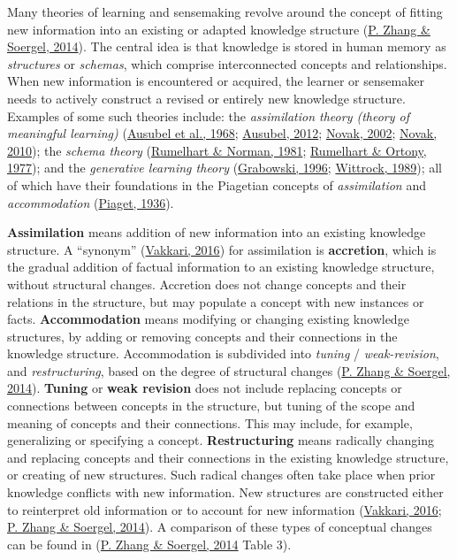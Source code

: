 \documentclass[a4paper, nobind]{templates/ociamthesis}
\begin{document}
Many theories of learning and sensemaking revolve around the concept of
fitting new information into an existing or adapted knowledge structure
(\protect\hyperlink{ref-zhang2014towards}{P. Zhang \& Soergel, 2014}). The central idea is that knowledge is stored in
human memory as \emph{structures} or \emph{schemas}, which comprise interconnected
concepts and relationships. When new information is encountered or
acquired, the learner or sensemaker needs to actively construct a
revised or entirely new knowledge structure. Examples of some such
theories include: the \emph{assimilation theory (theory of meaningful
learning)}
(\protect\hyperlink{ref-ausubel1968educational}{Ausubel et al., 1968}; \protect\hyperlink{ref-ausubel2012acquisition}{Ausubel, 2012}; \protect\hyperlink{ref-novak2002meaningful}{Novak, 2002}; \protect\hyperlink{ref-novak2010learninga}{Novak, 2010});
the \emph{schema theory}
(\protect\hyperlink{ref-rumelhart1981accretion}{Rumelhart \& Norman, 1981}; \protect\hyperlink{ref-rumelhart1977representation}{Rumelhart \& Ortony, 1977}); and the
\emph{generative learning theory}
(\protect\hyperlink{ref-grabowski1996generative}{Grabowski, 1996}; \protect\hyperlink{ref-wittrock1989generative}{Wittrock, 1989}); all of which have
their foundations in the Piagetian concepts of \emph{assimilation} and
\emph{accommodation} (\protect\hyperlink{ref-piaget1936origins}{Piaget, 1936}).

\textbf{Assimilation} means addition of new information into an existing
knowledge structure. A ``synonym'' (\protect\hyperlink{ref-vakkari2016searching}{Vakkari, 2016}) for
assimilation is \textbf{accretion}, which is the gradual addition of factual
information to an existing knowledge structure, without structural
changes. Accretion does not change concepts and their relations in the
structure, but may populate a concept with new instances or facts.
\textbf{Accommodation} means modifying or changing existing knowledge
structures, by adding or removing concepts and their connections in the
knowledge structure. Accommodation is subdivided into \emph{tuning} /
\emph{weak-revision}, and \emph{restructuring}, based on the degree of structural
changes (\protect\hyperlink{ref-zhang2014towards}{P. Zhang \& Soergel, 2014}). \textbf{Tuning} or \textbf{weak revision} does not
include replacing concepts or connections between concepts in the
structure, but tuning of the scope and meaning of concepts and their
connections. This may include, for example, generalizing or specifying a
concept. \textbf{Restructuring} means radically changing and replacing
concepts and their connections in the existing knowledge structure, or
creating of new structures. Such radical changes often take place when
prior knowledge conflicts with new information. New structures are
constructed either to reinterpret old information or to account for new
information (\protect\hyperlink{ref-vakkari2016searching}{Vakkari, 2016}; \protect\hyperlink{ref-zhang2014towards}{P. Zhang \& Soergel, 2014}). A comparison of
these types of conceptual changes can be found in (\protect\hyperlink{ref-zhang2014towards}{P. Zhang \& Soergel, 2014} Table 3).
\end{document}

